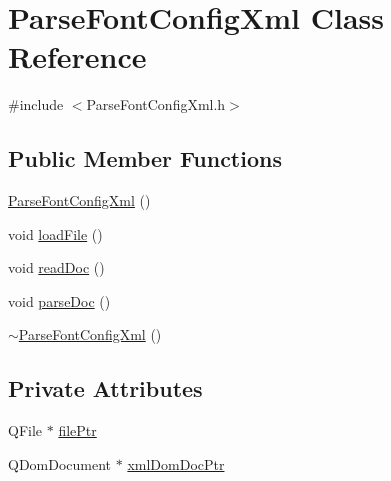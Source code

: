 \hypertarget{class_parse_font_config_xml}{\section{Parse\-Font\-Config\-Xml Class Reference}
\label{class_parse_font_config_xml}
}


{\ttfamily \#include $<$Parse\-Font\-Config\-Xml.\-h$>$}

\subsection*{Public Member Functions}
\begin{DoxyCompactItemize}
\item 
\hyperlink{class_parse_font_config_xml_a1c9f5e4c1a1637a3082ec914faf151d9}{Parse\-Font\-Config\-Xml} ()
\item 
void \hyperlink{class_parse_font_config_xml_a7e9e716a195b2d34aa86cd0bfe30ff4f}{load\-File} ()
\item 
void \hyperlink{class_parse_font_config_xml_a4453e6da18e869c57d187c0cc8ac3ba0}{read\-Doc} ()
\item 
void \hyperlink{class_parse_font_config_xml_ad3e9ffe38d0d4eef36d6bb4f7a3a20db}{parse\-Doc} ()
\item 
\hyperlink{class_parse_font_config_xml_a09f500614368657342378a7b72a04dfa}{$\sim$\-Parse\-Font\-Config\-Xml} ()
\end{DoxyCompactItemize}
\subsection*{Private Attributes}
\begin{DoxyCompactItemize}
\item 
Q\-File $\ast$ \hyperlink{class_parse_font_config_xml_a1b42e0d21b2363d136c4f8f3449db672}{file\-Ptr}
\item 
Q\-Dom\-Document $\ast$ \hyperlink{class_parse_font_config_xml_ac1f584710fc22d628bdca0e71308bffe}{xml\-Dom\-Doc\-Ptr}
\end{DoxyCompactItemize}


